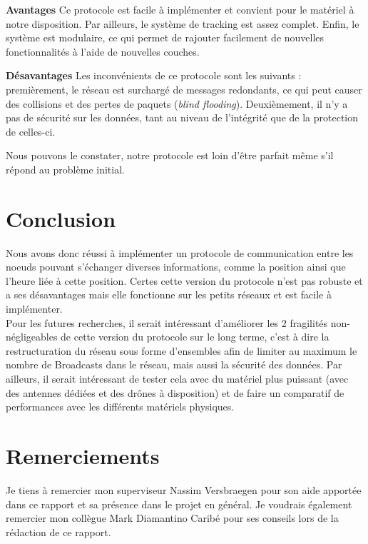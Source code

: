 \documentclass[journal, a4paper]{IEEEtran}
\begin{document}
        \textbf{Avantages} Ce protocole est facile à implémenter et convient pour le matériel à notre disposition. Par ailleurs, le système de tracking 
        est assez complet. Enfin, le système est modulaire, ce qui permet de rajouter facilement de nouvelles fonctionnalités à l'aide de nouvelles couches.  

        \textbf{Désavantages} Les inconvénients de ce protocole sont les suivants : premièrement, le réseau est surchargé de messages redondants, ce qui peut 
        causer des collisions et des pertes de paquets (\textit{blind flooding}). Deuxièmement, il n'y a pas de sécurité sur les données, tant au niveau de l'intégrité 
        que de la protection de celles-ci. 

        Nous pouvons le constater, notre protocole est loin d'être parfait même s'il répond au problème initial.

\section{Conclusion}
        Nous avons donc réussi à implémenter un protocole de communication entre les noeuds pouvant s'échanger diverses informations, comme la position ainsi que l'heure liée à cette position. 
        Certes cette version du protocole n'est pas robuste et a ses désavantages mais elle fonctionne sur les petits réseaux et est facile à implémenter. \\

        Pour les futures recherches, il serait intéressant d'améliorer les $2$ fragilités non-négligeables de cette version du protocole sur le long terme, 
        c'est à dire la restructuration du réseau sous forme d'ensembles afin de limiter au maximum le nombre de Broadcasts dans le réseau, mais aussi la sécurité des données. 
        Par ailleurs, il serait intéressant de tester cela avec du matériel plus puissant (avec des antennes dédiées et des drônes à disposition) et de faire un comparatif de performances avec les 
        différents matériels physiques.

\section{Remerciements}
        Je tiens à remercier mon superviseur Nassim Versbraegen pour son aide apportée dans ce rapport et sa présence dans le projet en général.
        Je voudrais également remercier mon collègue Mark Diamantino Caribé pour ses conseils lors de la rédaction de ce rapport. \newpage




\newpage
		
\appendices

\end{document}
